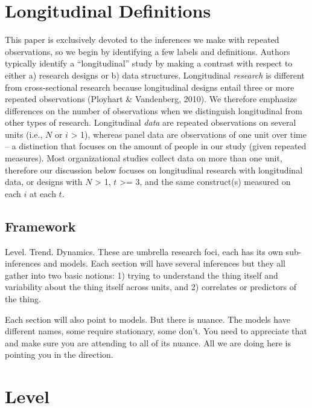 \documentclass[english,,man]{apa6}
\theoremstyle{definition}
\theoremstyle{definition}
\theoremstyle{definition}
\theoremstyle{remark}
\begin{document}
\hypertarget{longitudinal-definitions}{%
\section{Longitudinal Definitions}\label{longitudinal-definitions}}

This paper is exclusively devoted to the inferences we make with
repeated observations, so we begin by identifying a few labels and
definitions. Authors typically identify a \enquote{longitudinal} study
by making a contrast with respect to either a) research designs or b)
data structures. Longitudinal \emph{research} is different from
cross-sectional research because longitudinal designs entail three or
more repeated observations (Ployhart \& Vandenberg, 2010). We therefore
emphasize differences on the number of observations when we distinguish
longitudinal from other types of research. Longitudinal \emph{data} are
repeated observations on several units (i.e., \(N\) or \(i\)
\textgreater{} 1), whereas panel data are observations of one unit over
time -- a distinction that focuses on the amount of people in our study
(given repeated measures). Most organizational studies collect data on
more than one unit, therefore our discussion below focuses on
longitudinal research with longitudinal data, or designs with \(N\)
\textgreater{} 1, \(t\) \textgreater{}= 3, and the same construct(s)
measured on each \(i\) at each \(t\).

\hypertarget{framework}{%
\subsection{Framework}\label{framework}}

Level. Trend. Dynamics. These are umbrella research foci, each has its
own sub-inferences and models. Each section will have several inferences
but they all gather into two basic notions: 1) trying to understand the
thing itself and variability about the thing itself across units, and 2)
correlates or predictors of the thing.

Each section will also point to models. But there is nuance. The models
have different names, some require stationary, some don't. You need to
appreciate that and make sure you are attending to all of its nuance.
All we are doing here is pointing you in the direction.

\hypertarget{level}{%
\section{Level}\label{level}}
\end{document}
